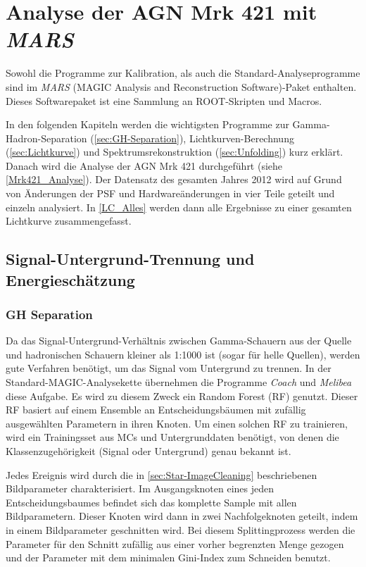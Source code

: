 \chapter{Analyse der AGN Mrk 421 mit \textit{MARS}}
Sowohl die Programme zur Kalibration, als auch die Standard-Analyseprogramme sind im \textit{MARS} (MAGIC Analysis and Reconstruction Software)-Paket enthalten.
Dieses Softwarepaket ist eine Sammlung an ROOT-Skripten und Macros.\cite{MARS}

In den folgenden Kapiteln werden die wichtigsten Programme zur Gamma-Hadron-Separation (\autoref{sec:GH-Separation}), Lichtkurven-Berechnung (\autoref{sec:Lichtkurve}) und Spektrumsrekonstruktion (\autoref{sec:Unfolding}) kurz erklärt.
Danach wird die Analyse der AGN Mrk 421 durchgeführt (siehe \autoref{Mrk421_Analyse}).
Der Datensatz des gesamten Jahres 2012 wird auf Grund von Änderungen der PSF und Hardwareänderungen in vier Teile geteilt und einzeln analysiert. 
In \autoref{LC_Alles} werden dann alle Ergebnisse zu einer gesamten Lichtkurve zusammengefasst.


\section{Signal-Untergrund-Trennung und Energieschätzung}
\label{sec:GH-Separation}
\subsection{GH Separation}
Da das Signal-Untergrund-Verhältnis zwischen Gamma-Schauern aus der Quelle und hadronischen Schauern kleiner als 1:1000 ist (sogar für helle Quellen), werden gute Verfahren benötigt, um das Signal vom Untergrund zu trennen.
In der Standard-MAGIC-Analysekette übernehmen die Programme \textit{Coach} und \textit{Melibea} diese Aufgabe. 
Es wird zu diesem Zweck ein Random Forest (RF) genutzt. \cite{RandomForestForMAGIC}
Dieser RF basiert auf einem Ensemble an Entscheidungsbäumen mit zufällig ausgewählten Parametern in ihren Knoten.
Um einen solchen RF zu trainieren, wird ein Trainingsset aus MCs und Untergrunddaten benötigt, von denen die Klassenzugehörigkeit (Signal oder Untergrund) genau bekannt ist.

Jedes Ereignis wird durch die in \autoref{sec:Star-ImageCleaning} beschriebenen Bildparameter charakterisiert.
Im Ausgangsknoten eines jeden Entscheidungsbaumes befindet sich das komplette Sample mit allen Bildparametern.
Dieser Knoten wird dann in zwei Nachfolgeknoten geteilt, indem in einem Bildparameter geschnitten wird.
Bei diesem Splittingprozess werden die  Parameter für den Schnitt zufällig aus einer vorher begrenzten Menge gezogen und der Parameter mit dem minimalen Gini-Index zum Schneiden benutzt.

